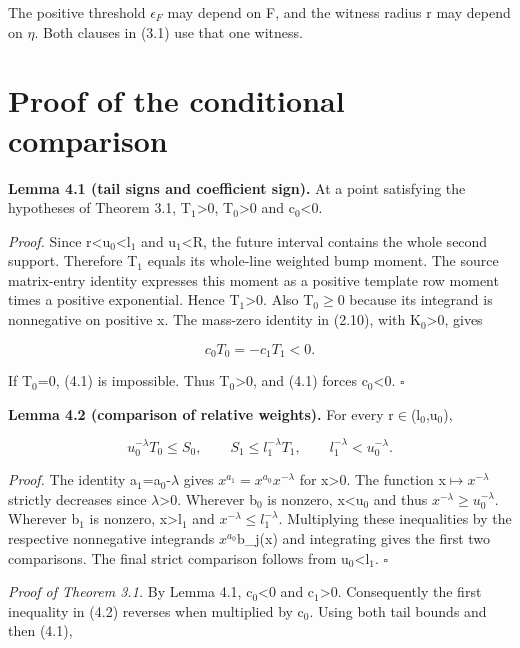 \documentclass[11pt,a4paper]{article}
\begin{document}
The positive threshold \(\epsilon _F\) may depend on F, and the witness radius r may depend on \ensuremath{\eta}. Both clauses in (3.1) use that one witness.

\section{Proof of the conditional comparison}

\textbf{Lemma 4.1 (tail signs and coefficient sign).} At a point satisfying the hypotheses of Theorem 3.1, T\ensuremath{{}_1}>0, T\ensuremath{{}_0}>0 and c\ensuremath{{}_0}<0.

\emph{Proof.} Since r<u\ensuremath{{}_0}<l\ensuremath{{}_1} and u\ensuremath{{}_1}<R, the future interval contains the whole second support. Therefore T\ensuremath{{}_1} equals its whole-line weighted bump moment. The source matrix-entry identity expresses this moment as a positive template row moment times a positive exponential. Hence T\ensuremath{{}_1}>0. Also T\ensuremath{{}_0}\ensuremath{\ge}0 because its integrand is nonnegative on positive x. The mass-zero identity in (2.10), with K\ensuremath{{}_0}>0, gives

\[
c_0T_0=-c_1T_1<0. \tag{4.1}
\]

If T\ensuremath{{}_0}=0, (4.1) is impossible. Thus T\ensuremath{{}_0}>0, and (4.1) forces c\ensuremath{{}_0}<0. \hfill\ensuremath{\square}

\textbf{Lemma 4.2 (comparison of relative weights).} For every r\ensuremath{\in}(l\ensuremath{{}_0},u\ensuremath{{}_0}),

\[
u_0^{-\lambda}T_0\le S_0,\qquad
S_1\le l_1^{-\lambda}T_1,\qquad
l_1^{-\lambda}<u_0^{-\lambda}. \tag{4.2}
\]

\emph{Proof.} The identity a\ensuremath{{}_1}=a\ensuremath{{}_0}-\ensuremath{\lambda} gives \(x^{a_1}=x^{a_0}\)\(x^{-\lambda }\) for x>0. The function x\ensuremath{\mapsto}\(x^{-\lambda }\) strictly decreases since \ensuremath{\lambda}>0. Wherever b\ensuremath{{}_0} is nonzero, x<u\ensuremath{{}_0} and thus \(x^{-\lambda }\ge u_0^{-\lambda }\). Wherever b\ensuremath{{}_1} is nonzero, x>l\ensuremath{{}_1} and \(x^{-\lambda }\le l_1^{-\lambda }\). Multiplying these inequalities by the respective nonnegative integrands \(x^{a_0}\)b\_j(x) and integrating gives the first two comparisons. The final strict comparison follows from u\ensuremath{{}_0}<l\ensuremath{{}_1}. \hfill\ensuremath{\square}

\emph{Proof of Theorem 3.1.} By Lemma 4.1, c\ensuremath{{}_0}<0 and c\ensuremath{{}_1}>0. Consequently the first inequality in (4.2) reverses when multiplied by c\ensuremath{{}_0}. Using both tail bounds and then (4.1),
\end{document}
